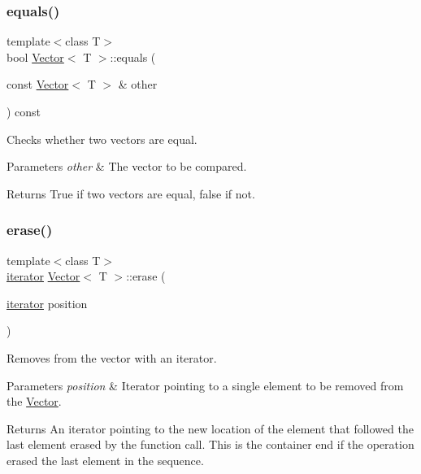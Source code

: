 \subsubsection{\texorpdfstring{equals()}{equals()}\hspace{0.1cm}{\footnotesize\ttfamily [2/2]}}
{\footnotesize\ttfamily template$<$class T$>$ \\
bool \hyperlink{classVector}{Vector}$<$ T $>$\+::equals (\begin{DoxyParamCaption}\item[{const \hyperlink{classVector}{Vector}$<$ T $>$ \&}]{other }\end{DoxyParamCaption}) const\hspace{0.3cm}{\ttfamily [inline]}}

Checks whether two vectors are equal. 
\begin{DoxyParams}{Parameters}
{\em other} & The vector to be compared. \\
\hline
\end{DoxyParams}
\begin{DoxyReturn}{Returns}
True if two vectors are equal, false if not. 
\end{DoxyReturn}
\mbox{\label{classVector_a65771dd1c5da427eabb9818ba9558113}} 
\subsubsection{\texorpdfstring{erase()}{erase()}\hspace{0.1cm}{\footnotesize\ttfamily [1/6]}}
{\footnotesize\ttfamily template$<$class T$>$ \\
\hyperlink{classVector_a45531016f99e90887e0f890f2da943e4}{iterator} \hyperlink{classVector}{Vector}$<$ T $>$\+::erase (\begin{DoxyParamCaption}\item[{\hyperlink{classVector_a45531016f99e90887e0f890f2da943e4}{iterator}}]{position }\end{DoxyParamCaption})\hspace{0.3cm}{\ttfamily [inline]}}



Removes from the vector with an iterator. 


\begin{DoxyParams}{Parameters}
{\em position} & Iterator pointing to a single element to be removed from the \hyperlink{classVector}{Vector}. \\
\hline
\end{DoxyParams}
\begin{DoxyReturn}{Returns}
An iterator pointing to the new location of the element that followed the last element erased by the function call. This is the container end if the operation erased the last element in the sequence. 
\end{DoxyReturn}
\mbox{\label{classVector_a65771dd1c5da427eabb9818ba9558113}} 
